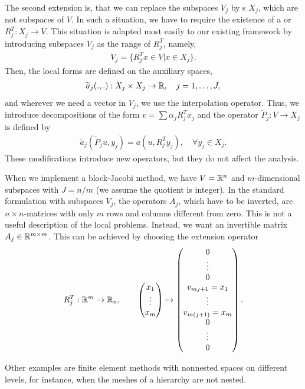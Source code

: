 \begin{remark}
  The second extension is, that we can replace the subspaces $V_j$ by
  s $X_j$, which are not subspaces of
  $V$. In such a situation, we have to require the existence of a
   or  $R_j^T: X_j
  \to V$. This situation is adapted most easily to our existing
  framework by introducing subspaces $V_j$ as the range of $R_j^T$,
  namely,
  \begin{gather}
    \label{eq:schwarz:40}
    V_j = \bigl\{ R_j^T x \in V \big| x\in X_j \bigr\}.
  \end{gather}
  Then, the local forms are defined on the auxiliary spaces,
  \begin{gather}
    \label{eq:schwarz:41}
    \widetilde a_j(.,.) : X_j\times X_j \to \mathbb R, \quad j=1,\dots,J,
  \end{gather}
  and wherever we need a vector in $V_j$, we use the interpolation
  operator. Thus, we introduce decompositions of the form $v = \sum
  \alpha_j R_j^T x_j$ and the operator $\widetilde P_j: V \to X_j$ is
  defined by
  \begin{gather}
    \label{eq:schwarz:43}
    \widetilde a_j(\widetilde P_j u, y_j) = a(u, R_j^T y_j),
    \quad \forall y_j \in X_j.
  \end{gather}
  These modifications introduce new operators, but they do not affect
  the analysis.
\end{remark}

\begin{example}
  When we implement a block-Jacobi method, we have $V = \mathbb R^n$ and
  $m$-dimensional subspaces with $J=n/m$ (we assume the quotient is
  integer). In the standard formulation with subspaces $V_j$, the
  operators $A_j$, which have to be inverted, are $n\times n$-matrices
  with only $m$ rows and columns different from zero. This is not a
  useful description of the local problems. Instead, we want an
  invertible matrix $A_j \in \mathbb R^{m\times m}$. This can be achieved by
  choosing the extension operator
  \begin{gather}
    R_j^T : \mathbb R^m \to \mathbb R_n,
    \qquad
    \begin{pmatrix}
      x_1 \\ \vdots \\ x_m
    \end{pmatrix}
    \mapsto
    \begin{pmatrix}
      0\\ \vdots \\ 0 \\
      v_{mj+1} = x_1 \\ \vdots \\ v_{m(j+1)} = x_m
      \\ 0\\ \vdots \\ 0
    \end{pmatrix}.
  \end{gather}
\end{example}

\begin{example}
  Other examples are finite element methods with nonnested spaces on
  different levels, for instance, when the meshes of a hierarchy are
  not nested.
\end{example}
